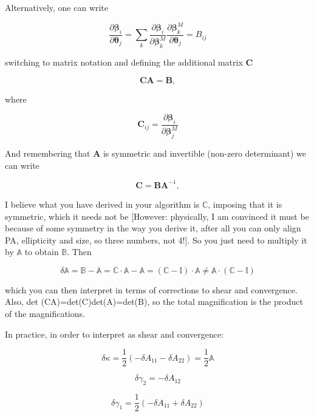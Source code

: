 Alternatively, one can write

\begin{equation}
\frac{\partial \boldsymbol \beta_i}{\partial \boldsymbol \theta_j}=
\sum_{k}\frac{\partial \boldsymbol \beta_i}{\partial \boldsymbol \beta^M_k}
\frac{\partial \boldsymbol \beta^M_k}{\partial \boldsymbol \theta_j}=
B_{ij}
\label{eq:magnificationm}
\end{equation}

switching to matrix notation and defining the additional matrix $\mathbf C$

\begin{equation}
\mathbf C  \mathbf A = \mathbf B,
\label{eq:matrix1}
\end{equation}

where

\begin{equation}
\mathbf C_{ij} = \frac{\partial \boldsymbol \beta_i}{\partial \boldsymbol \beta^M_j}
\label{eq:defC}
\end{equation}

And remembering that $\mathbf A$ is symmetric and invertible (non-zero determinant) we can write

\begin{equation}
\mathbf C = \mathbf B \mathbf A^{-1},
\label{eq:matrix1}
\end{equation}

I believe what you have derived in your algorithm is $\mathbb C$,
imposing that it is symmetric, which it needs not be [However:
physically, I am convinced it must be because of some symmetry in the
way you derive it, after all you can only align PA, ellipticity and
size, so three numbers, not 4!]. So you just need to multiply it by
$\mathbb A$ to obtain $\mathbb B$. Then

\begin{equation}
    \delta \mathbb A = \mathbb B - \mathbb A= \mathbb C \cdot \mathbb A - \mathbb A = \mathbb {(C-I)\cdot A} \neq 
    \mathbb {A\cdot (C-I)}
\label{eq:matrix1}
\end{equation}

which you can then interpret in terms of corrections to shear and
convergence. Also, det (CA)=det(C)det(A)=det(B), so the total
magnification is the product of the magnifications.

In practice, in order to interpret as shear and convergence:

\begin{equation}
\delta \kappa =
\frac{1}{2}(-\delta A_{11} - \delta A_{22}) =
\frac{1}{2} \mathbb A
\end{equation}

\begin{equation}
\delta \gamma_2 = -\delta A_{12}
\end{equation}

\begin{equation}
\delta \gamma_1 = \frac{1}{2} (-\delta A_{11} + \delta A_{22})
\end{equation}


